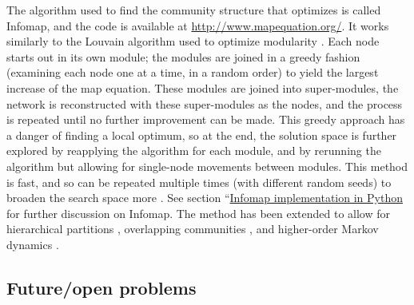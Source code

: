 The algorithm used to find the community structure that optimizes is
called Infomap, and the code is available at
\url{http://www.mapequation.org/}. It works similarly to the Louvain
algorithm used to optimize modularity \autocite{blondel_fast_2008}. Each
node starts out in its own module; the modules are joined in a greedy
fashion (examining each node one at a time, in a random order) to yield
the largest increase of the map equation. These modules are joined into
super-modules, the network is reconstructed with these super-modules as
the nodes, and the process is repeated until no further improvement can
be made. This greedy approach has a danger of finding a local optimum,
so at the end, the solution space is further explored by reapplying the
algorithm for each module, and by rerunning the algorithm but allowing
for single-node movements between modules. This method is fast, and so
can be repeated multiple times (with different random seeds) to broaden
the search space more
\autocites{rosvall_maps_2008}{rosvall_map_2010}{rosvall_multilevel_2011}.
See section ``\protect\hyperlink{pyinfomap}{Infomap implementation in
Python} for further discussion on Infomap. The method has been extended
to allow for hierarchical partitions \autocite{rosvall_multilevel_2011},
overlapping communities \autocite{viamontes_esquivel_compression_2011},
and higher-order Markov dynamics \autocite{rosvall_memory_2014}.

\subsection{Future/open problems}\label{futureopen-problems}

